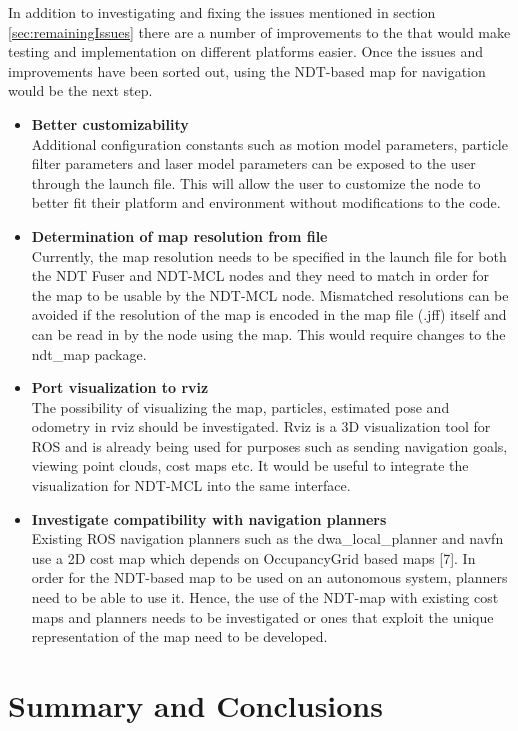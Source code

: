 \documentclass[12pt]{article}
\begin{document}
	In addition to investigating and fixing the issues mentioned in section \ref{sec:remainingIssues} there are a number of improvements to the that would make testing and implementation on different platforms easier. Once the issues and improvements have been sorted out, using the NDT-based map for navigation would be the next step. 
	
	\begin{itemize}		
		\item \textbf{Better customizability}\\
		Additional configuration constants such as motion model parameters, particle filter parameters and laser model parameters can be exposed to the user through the launch file. This will allow the user to customize the node to better fit their platform and environment without modifications to the code.
		\item \textbf{Determination of map resolution from file}\\
		Currently, the map resolution needs to be specified in the launch file for both the NDT Fuser and NDT-MCL nodes and they need to match in order for the map to be usable by the NDT-MCL node. Mismatched resolutions can be avoided if the resolution of the map is encoded in the map file (.jff) itself and can be read in by the node using the map. This would require changes to the ndt\_map package.
		\item \textbf{Port visualization to rviz}\\
		The possibility of visualizing the map, particles, estimated pose and odometry in rviz should be investigated. Rviz is a 3D visualization tool for ROS and is already being used for purposes such as sending navigation goals, viewing point clouds, cost maps etc. It would be useful to integrate the visualization for NDT-MCL into the same interface.
		\item \textbf{Investigate compatibility with navigation planners}\\
	Existing ROS navigation planners such as the dwa\_local\_planner and navfn use a 2D cost map which depends on OccupancyGrid based maps [7]. In order for the NDT-based map to be used on an autonomous system, planners need to be able to use it. Hence, the use of the NDT-map with existing cost maps and planners needs to be investigated or ones that exploit the unique representation of the map need to be developed.
	\end{itemize}

	\section{Summary and Conclusions}
	\label{sec:summaryAndConclusions}
\end{document}
